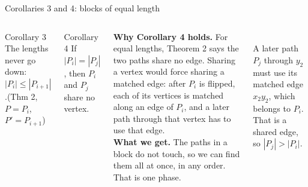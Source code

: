 \documentclass[aspectratio=169,11pt]{beamer}
\begin{document}
\begin{frame}{Corollaries 3 and 4: blocks of equal length}
\begin{columns}[T]
\begin{block}{Corollary 3}
The lengths never go down: $|P_i|\le|P_{i+1}|$.\hfill{\scriptsize (Thm 2, $P=P_i$, $P'=P_{i+1}$)}
\end{block}
\begin{block}{Corollary 4}
If $|P_i|=|P_j|$, then $P_i$ and $P_j$ share no vertex.
\end{block}
\footnotesize\textbf{Why Corollary 4 holds.} For equal lengths, Theorem 2 says the two paths share no edge. Sharing a vertex would force sharing a matched edge: after $P_i$ is flipped, each of its vertices is matched along an edge of $P_i$, and a later path through that vertex has to use that edge.\\[1mm]
\textbf{What we get.} The paths in a block do not touch, so we can find them all at once, in any order. That is one phase.
\centering
{}\\[1mm]
{\footnotesize A later path $P_j$ through $y_2$ must use its matched edge $x_2y_2$, which belongs to $P_i$. That is a shared edge, so $|P_j|>|P_i|$.}
\end{columns}
\end{frame}
\end{document}
